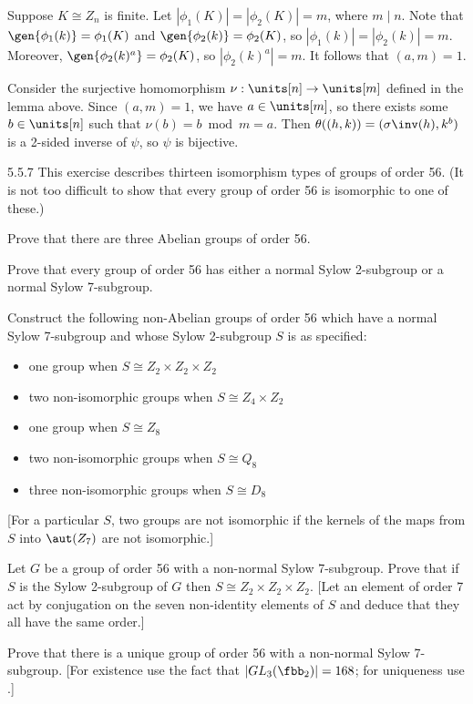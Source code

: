 \begin{sol}[spsol]
\begin{enumerate}
        Suppose $K \cong Z_n$ is finite.
	Let $|\phi_1(K)| = |\phi_2(K)| = m$, where $m \mid n$.
	Note that $\gen{\phi_1(k)} = \phi_1(K)$ and $\gen{\phi_2(k)} = \phi_2(K)$, so $|\phi_1(k)| = |\phi_2(k)| = m$.
	Moreover, $\gen{\phi_2(k)^a} = \phi_2(K)$, so $|\phi_2(k)^a| = m$.
	It follows that $(a, m) = 1$. 
        
        Consider the surjective homomorphism $\nu : \units[n] \to \units[m]$ defined in the lemma above.
	Since $(a, m) = 1$, we have $a \in \units[m]$, so there exists some $b \in \units[n]$ such that $\nu(b) = b \bmod m = a$.
	Then $\theta((h, k)) = (\sigma\inv(h), k^b)$ is a 2-sided inverse of $\psi$, so $\psi$ is bijective. \qedhere
    \end{enumerate}
\end{sol}

\begin{spex}{5.5.7}
    This exercise describes thirteen isomorphism types of groups of order 56. (It is not too difficult to show that every group of order 56 is isomorphic to one of these.)
    \begin{subexercises}
        \item Prove that there are three Abelian groups of order 56.
        \item Prove that every group of order 56 has either a normal Sylow 2-subgroup or a normal Sylow 7-subgroup.
        \item Construct the following non-Abelian groups of order 56 which have a normal Sylow 7-subgroup and whose Sylow 2-subgroup $S$ is as specified:
        \begin{itemize}
            \item one group when $S \cong Z_2 \times Z_2 \times Z_2$
            \item two non-isomorphic groups when $S \cong Z_4 \times Z_2$
            \item one group when $S \cong Z_8$
            \item two non-isomorphic groups when $S \cong Q_8$
            \item three non-isomorphic groups when $S \cong D_8$
        \end{itemize}
        [For a particular $S$, two groups are not isomorphic if the kernels of the maps from $S$ into $\aut(Z_7)$ are not isomorphic.]
        \item Let $G$ be a group of order 56 with a non-normal Sylow 7-subgroup.
	    Prove that if $S$ is the Sylow 2-subgroup of $G$ then $S \cong Z_2 \times Z_2 \times Z_2$. [Let an element of order 7 act by conjugation on the seven non-identity elements of $S$ and deduce that they all have the same order.]
        \item Prove that there is a unique group of order 56 with a non-normal Sylow 7-subgroup. [For existence use the fact that $|GL_3(\fbb_2)| = 168$; for uniqueness use .]
    \end{subexercises}
\end{spex}

